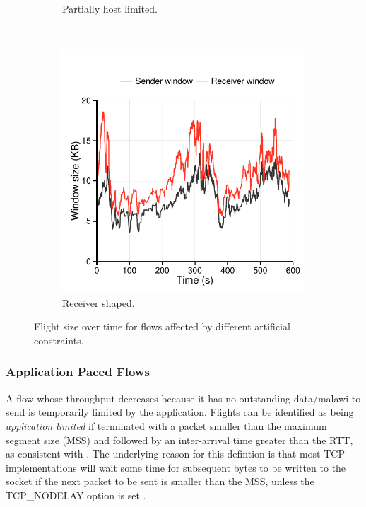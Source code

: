 \begin{figure}[!ht]
\begin{subfigure}[b]{1.0\linewidth}
    \caption{Partially host limited. \label{fig:hostlimited}}
  \end{subfigure}\\
  \begin{subfigure}[b]{1.0\linewidth}
    \includegraphics[width=1.0\textwidth]{figures/malawi/awnd.pdf}
    \caption{Receiver shaped. \label{fig:awnd}}
  \end{subfigure}
  \caption{Flight size over time for flows affected by different artificial constraints. \label{fig:kindsOfFlowEffect}}
\end{figure}


\subsubsection{Application Paced Flows}
\label{sssec:app}

A flow whose throughput decreases because it has no outstanding data/malawi to send is temporarily limited by the application. 
Flights can be identified as being \emph{application limited} if terminated with a packet smaller than the maximum segment size (MSS) and followed by an inter-arrival time greater than the RTT, as consistent with \cite{Zhang:2002p85}. The underlying reason for this defintion is that most TCP implementations will wait some time for subsequent bytes to be written to the socket if the next packet to be sent is smaller than the MSS, unless the TCP\_NODELAY option is set \cite{nagle1984rfc}.

